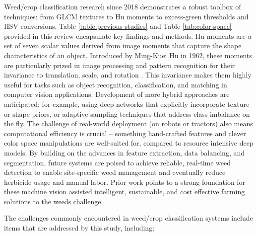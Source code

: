 \documentclass[letterpaper, notitlepage]{report}
\begin{document}
%
Weed/crop classification research since 2018 demonstrates a robust toolbox of techniques: from GLCM textures to Hu moments to excess-green thresholds and HSV conversions. Table \ref{table:previous-studies} and Table \ref{tab:color-space} provided in this review encapsulate key findings and methods. Hu moments are a set of seven scalar values derived from image moments that capture the shape characteristics of an object. Introduced by Ming-Kuei Hu in 1962, these moments are particularly prized in image processing and pattern recognition for their invariance to translation, scale, and rotation \cite{Hu1962-dq}. This invariance makes them highly useful for tasks such as object recognition, classification, and matching in computer vision applications. Development of more hybrid approaches are anticipated: for example, using deep networks that explicitly incorporate texture or shape priors, or adaptive sampling techniques that address class imbalance on the fly. The challenge of real-world deployment (on robots or tractors) also means computational efficiency is crucial – something hand-crafted features and clever color space manipulations  are well-suited for, compared to resource intensive deep models. By building on the advances in feature extraction, data balancing, and segmentation, future systems are poised to achieve reliable, real-time weed detection to enable site-specific weed management and eventually reduce herbicide usage and manual labor. Prior work points to  a strong foundation for these machine vision assisted intelligent, sustainable, and cost effective farming solutions to the weeds challenge.
%
%

The challenges commonly encountered in weed/crop classification systems include items that are addressed by this study, including:
\end{document}
